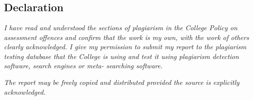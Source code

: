 \documentclass[12pt, twoside, a4paper, openright]{report}
\begin{document}

\chapter*{}

\vfill
\section*{Declaration}
\textit{I have read and understood the sections of plagiarism in the College Policy on assessment offences and confirm that the work is my own, with the work of others clearly acknowledged. I give my permission to submit my report to the plagiarism testing database that the College is using and test it using plagiarism detection software, search engines or meta- searching software.}

\textit{The report may be freely copied and distributed provided the source is explicitly acknowledged.}
\vfill

\cleardoublepage



\tableofcontents
\thispagestyle{empty}
\cleardoublepage
    
\setcounter{page}{1}










\printbibliography[heading=bibintoc,
title={References}]
\end{document}
